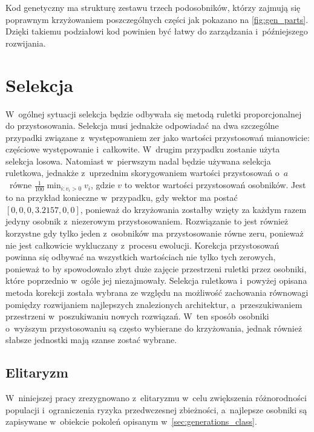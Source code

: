 Kod genetyczny ma strukturę zestawu trzech podosobników,
którzy zajmują się poprawnym krzyżowaniem poszczególnych
części jak pokazano na \cref{fig:gen_parts}.
Dzięki takiemu podziałowi kod powinien być łatwy
do zarządzania i~późniejszego rozwijania.

\section{Selekcja}
\label{sec:selection}
W~ogólnej sytuacji selekcja będzie odbywała się
metodą ruletki proporcjonalnej do przystosowania.
Selekcja musi jednakże odpowiadać na dwa szczególne
przypadki związane z~występowaniem zer
jako wartości przystosowań mianowicie:
częściowe występowanie i~całkowite.
W~drugim przypadku zostanie użyta selekcja losowa.
Natomiast w~pierwszym nadal będzie
używana selekcja ruletkowa,
jednakże z~uprzednim skorygowaniem wartości
przystosowań o~$a$~równe
$\displaystyle \frac{1}{100}\min_{i: v_i>0}{v_i}$,
gdzie $v$ to wektor wartości przystosowań osobników.
Jest to na przykład konieczne w~przypadku,
gdy wektor ma postać $\left[0,0,0,3.2157,0,0\right]$,
ponieważ do krzyżowania zostałby wzięty za każdym
razem jedyny osobnik z~niezerowym przystosowaniem.
Rozwiązanie to jest również korzystne gdy tylko
jeden z~osobników ma przystosowanie równe zeru,
ponieważ nie jest całkowicie
wykluczany z~procesu ewolucji.
Korekcja przystosowań powinna się odbywać
na wszystkich wartościach nie tylko tych zerowych,
ponieważ to by spowodowało zbyt duże zajęcie
przestrzeni ruletki przez osobniki,
które poprzednio w~ogóle jej niezajmowały.
Selekcja ruletkowa i~powyżej opisana metoda korekcji
została wybrana ze względu na możliwość
zachowania równowagi pomiędzy rozwijaniem
najlepszych znalezionych architektur,
a~przeszukiwaniem przestrzeni
w~poszukiwaniu nowych rozwiązań.
W~ten sposób osobniki o~wyższym przystosowaniu
są często wybierane do krzyżowania,
jednak również słabsze jednostki
mają szanse zostać wybrane.

\subsection*{Elitaryzm}
W~niniejszej pracy zrezygnowano z~elitaryzmu
w~celu zwiększenia różnorodności populacji
i~ograniczenia ryzyka przedwczesnej zbieżności,
a~najlepsze osobniki są zapisywane w~obiekcie
pokoleń opisanym w~\cref{sec:generations_class}.  


